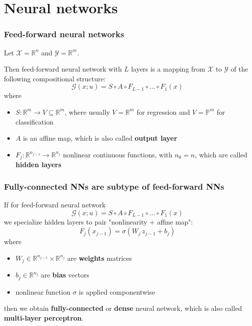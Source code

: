 \documentclass[11pt,aspectratio=169,t]{beamer}
\newcommand{\R}{\mathbb R}
\newcommand{\Model}{\mathcal G}
\renewcommand{\Pr}{\mathbb P}
\begin{document}
\section{Neural networks}

\begin{frame}
\frametitle{Feed-forward neural networks}

Let \(\mathcal X=\R^n\) and \(\mathcal Y=\R^m\).

Then feed-forward neural network with \(L\) layers is a mapping from
\(\mathcal X\) to \(\mathcal Y\)
of the following compositional structure:
\[
    \Model(x; u) = S \circ A \circ F_{L-1} \circ \dots \circ F_1(x)
\]
where
\begin{itemize}
    \item \(S: \R^m \to V \subseteq \R^m \), where usually \(V=\R^m\) for
    regression and \(V=\Pr^m\) for classification
    \item \(A\) is an affine map, which is also called \textbf{output layer}
    \item \(F_j : \R^{n_{j-1}} \to \R^{n_j} \) nonlinear continuous
    functions, with \(n_0 = n\), which are called \textbf{hidden layers}
\end{itemize}
\end{frame}

\begin{frame}
\frametitle{Fully-connected NNs are subtype of feed-forward NNs}

If for feed-forward neural network
\[
    \Model(x; u) = S \circ A \circ F_{L-1} \circ \dots \circ F_1(x)
\]
we specialize hidden layers to pair "nonlinearity + affine map":
\[
    F_j(x_{j-1}) = \sigma(W_j \, z_{j-1} + b_j)
\]
where
\begin{itemize}
    \item \(W_j \in \R^{n_{j-1}} \times \R^{n_j}\) are \textbf{weights} matrices
    \item \(b_j \in \R^{n_j}\) are \textbf{bias} vectors
    \item nonlinear function \(\sigma\) is applied componentwise
\end{itemize}
then we obtain \textbf{fully-connected} or \textbf{dense} neural network, which
is also called \textbf{multi-layer perceptron}.

\end{frame}
\end{document}
